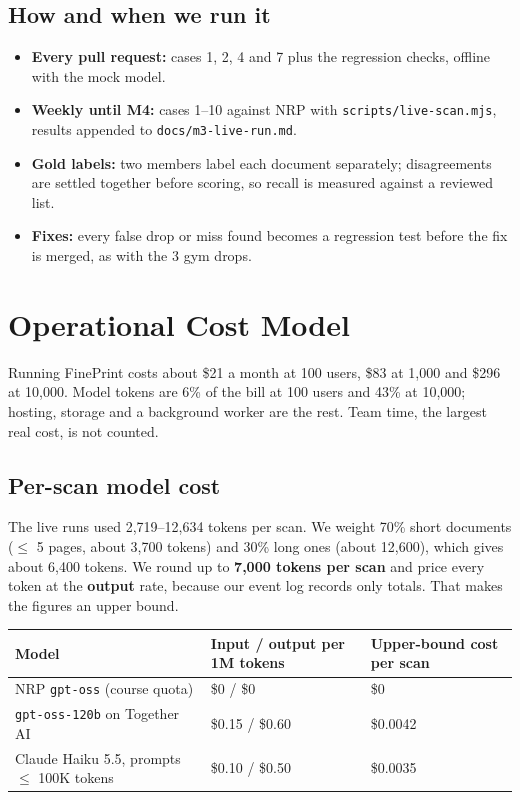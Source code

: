 \documentclass[11pt,letterpaper]{article}
\newcommand{\code}[1]{\texttt{#1}}
\begin{document}
\subsection{How and when we run it}

\begin{itemize}
  \item \textbf{Every pull request:} cases 1, 2, 4 and 7 plus the regression checks, offline with the mock model.
  \item \textbf{Weekly until M4:} cases 1--10 against NRP with \code{scripts/live-scan.mjs}, results appended to \code{docs/m3-live-run.md}.
  \item \textbf{Gold labels:} two members label each document separately; disagreements are settled together before scoring, so recall is measured against a reviewed list.
  \item \textbf{Fixes:} every false drop or miss found becomes a regression test before the fix is merged, as with the 3 gym drops.
\end{itemize}

\section{Operational Cost Model}

Running FinePrint costs about \$21 a month at 100 users, \$83 at 1,000 and \$296 at 10,000. Model tokens are 6\% of the bill at 100 users and 43\% at 10,000; hosting, storage and a background worker are the rest. Team time, the largest real cost, is not counted.

\subsection{Per-scan model cost}

The live runs used 2,719--12,634 tokens per scan. We weight 70\% short documents ($\le$ 5 pages, about 3,700 tokens) and 30\% long ones (about 12,600), which gives about 6,400 tokens. We round up to \textbf{7,000 tokens per scan} and price every token at the \textbf{output} rate, because our event log records only totals. That makes the figures an upper bound.

\begin{table}[htbp]
\centering
\small
\begin{tabularx}{\textwidth}{@{}Lp{4.4cm}p{3.6cm}@{}}
\toprule
\textbf{Model} & \textbf{Input / output per 1M tokens} & \textbf{Upper-bound cost per scan} \\
\midrule
NRP \code{gpt-oss} (course quota) & \$0 / \$0 & \$0 \\
\code{gpt-oss-120b} on Together AI \cite{together} & \$0.15 / \$0.60 & \$0.0042 \\
Claude Haiku 5.5, prompts $\le$ 100K tokens \cite{claude} & \$0.10 / \$0.50 & \$0.0035 \\
\bottomrule
\end{tabularx}
\end{table}
\end{document}
